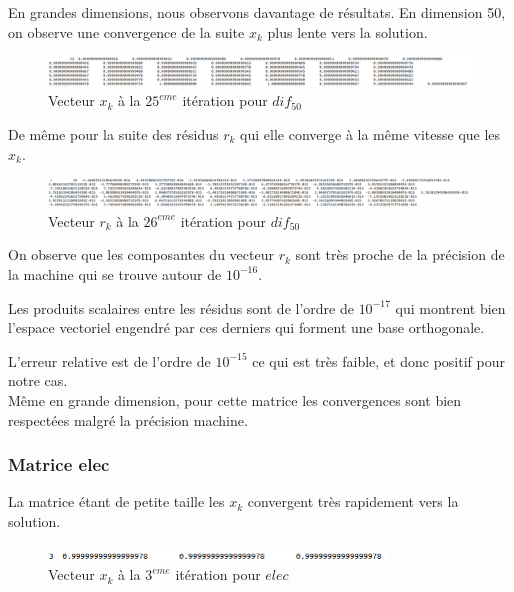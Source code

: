 \documentclass[12,french]{report}
\begin{document}
En grandes dimensions, nous observons davantage de résultats. En dimension 50, on observe une convergence de la suite $x_{k}$ plus lente vers la solution. \\

\begin{figure}[htb!]
	\centering
	\includegraphics[width=1\textwidth]{./Images/x_dif_50}
	\caption{Vecteur $x_{k}$ à la $25^{eme}$ itération pour $dif_{50}$}
\end{figure}\vspace{0.2cm}

De même pour la suite des résidus $r_{k}$ qui elle converge à la même vitesse que les $x_{k}$. \\

\begin{figure}[htb!]
	\centering
	\includegraphics[width=1\textwidth]{./Images/r_dif_50}
	\caption{Vecteur $r_{k}$ à la $26^{eme}$ itération pour $dif_{50}$}
\end{figure}\vspace{0.2cm}

On observe que les composantes du vecteur $r_{k}$ sont très proche de la précision de la machine qui se trouve autour de $10^{-16}$.

Les produits scalaires entre les résidus sont de l'ordre de $10^{-17}$ qui montrent bien l'espace vectoriel engendré par ces derniers qui forment une base orthogonale.

L'erreur relative est de l'ordre de $10^{-15}$ ce qui est très faible, et donc positif pour notre cas.\\

Même en grande dimension, pour cette matrice les convergences sont bien respectées malgré la précision machine.

\subsubsection{Matrice elec}

La matrice étant de petite taille les $x_{k}$ convergent très rapidement vers la solution.\\

\begin{figure}[htb!]
	\centering
	\includegraphics[width=0.8\textwidth]{./Images/x_elec}
	\caption{Vecteur $x_{k}$ à la $3^{eme}$ itération pour $elec$}
\end{figure}\vspace{0.2cm}
\end{document}
